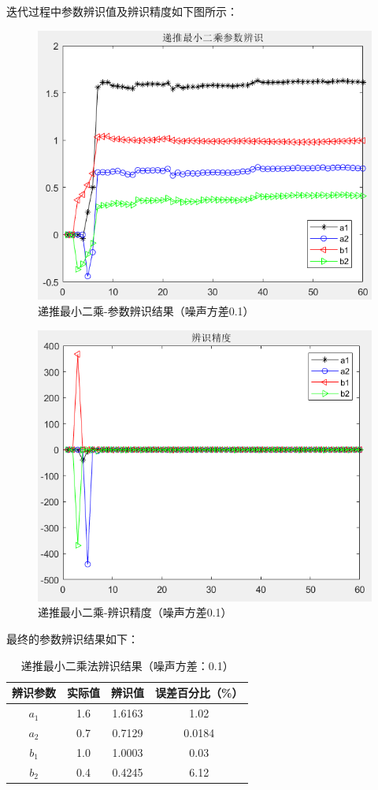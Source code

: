 \documentclass[UTF8]{article}
\begin{document}
迭代过程中参数辨识值及辨识精度如下图所示：
\begin{figure}[H]
    \centering %
    \includegraphics[width=.8\textwidth]{figure/递推最小二乘-参数辨识结果.png} 
    \caption{递推最小二乘-参数辨识结果（噪声方差0.1）} %
\end{figure}
\begin{figure}[H]
    \centering %
    \includegraphics[width=.8\textwidth]{figure/递推最小二乘-辨识精度.png} 
    \caption{递推最小二乘-辨识精度（噪声方差0.1）} %
\end{figure}

最终的参数辨识结果如下：
\begin{table}[H]
\centering %
\begin{tabular}{cccc} %
    \toprule %
    辨识参数 & 实际值 & 辨识值 & 误差百分比（\%） \\
    \midrule %
    $a_1$ & 1.6 & 1.6163 & 1.02 \\
    $a_2$ & 0.7 & 0.7129 & 0.0184 \\
    $b_1$ & 1.0 & 1.0003 & 0.03 \\
    $b_2$ & 0.4 & 0.4245 & 6.12 \\
    \bottomrule %
\end{tabular}
\caption{递推最小二乘法辨识结果（噪声方差：0.1）} %
\end{table}
\end{document}
